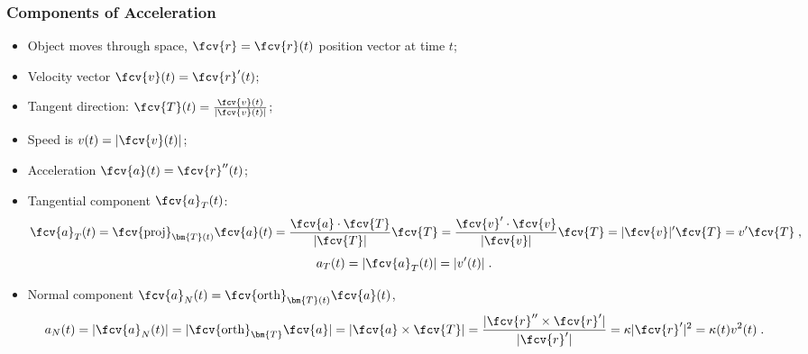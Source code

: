 \begin{frame}
  \frametitle{Components of Acceleration}
  
  \begin{itemize}
    \item Object moves through space, $\fcv{r}=\fcv{r}(t)$ position vector at time $t$;
    \item Velocity vector $\fcv{v}(t) = \fcv{r}'(t)$; 
    \item Tangent direction: $\fcv{T}(t) = \frac{\fcv{v}(t)}{|\fcv{v}(t)|}$;
    \item Speed is $v(t) = |\fcv{v}(t)|$;
    \item Acceleration $\fcv{a}(t) = \fcv{r}''(t)$;
    \item Tangential component $\fcv{a}_T(t)$:
%
$$\fcv{a}_T(t) =
\fcv{\text{proj}}_{\bm{T}(t)} \fcv{a}(t) =
\frac{\fcv{a}\cdot \fcv{T}}{|\fcv{T}|}
\fcv{T} = \frac{\fcv{v}'\cdot \fcv{v}}
{|\fcv{v}|} \fcv{T} =
|\fcv{v}|' \fcv{T} = v' \fcv{T}\;,$$
%
$$a_T(t) = |\fcv{a}_T(t)| = |v'(t)|\; .$$

\item Normal component $\fcv{a}_N(t)=\fcv{\text{orth}}_{\bm{T}(t)} \fcv{a}(t)$,
%
$$a_N(t) = |\fcv{a}_N(t)| = |\fcv{\text{orth}}_{\bm{T}} \fcv{a}| =
|\fcv{a} \times \fcv{T}| =
\frac{|\fcv{r}'' \times \fcv{r}'|}
{|\fcv{r}'|} = \kappa |\fcv{r}'|^2 =
\kappa(t) v^2(t)  \; .$$
  \end{itemize}

\end{frame}